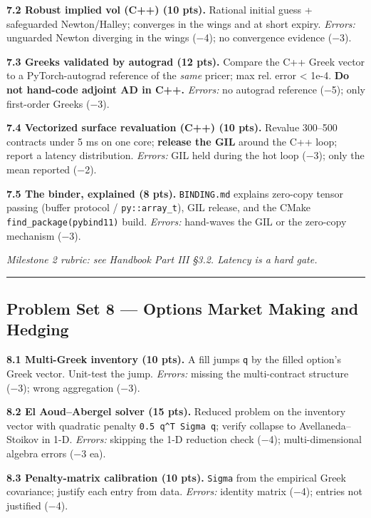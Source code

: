 \documentclass[
]{article}
\begin{document}
\textbf{7.2 Robust implied vol (C++) (10 pts).} Rational initial guess +
safeguarded Newton/Halley; converges in the wings and at short expiry.
\emph{Errors:} unguarded Newton diverging in the wings (−4); no
convergence evidence (−3).

\textbf{7.3 Greeks validated by autograd (12 pts).} Compare the C++
Greek vector to a PyTorch-autograd reference of the \emph{same} pricer;
max rel. error \textless{} 1e-4. \textbf{Do not hand-code adjoint AD in
C++.} \emph{Errors:} no autograd reference (−5); only first-order Greeks
(−3).

\textbf{7.4 Vectorized surface revaluation (C++) (10 pts).} Revalue
300--500 contracts under 5 ms on one core; \textbf{release the GIL}
around the C++ loop; report a latency distribution. \emph{Errors:} GIL
held during the hot loop (−3); only the mean reported (−2).

\textbf{7.5 The binder, explained (8 pts).} \texttt{BINDING.md} explains
zero-copy tensor passing (buffer protocol / \texttt{py::array\_t}), GIL
release, and the CMake \texttt{find\_package(pybind11)} build.
\emph{Errors:} hand-waves the GIL or the zero-copy mechanism (−3).

\emph{Milestone 2 rubric: see Handbook Part III §3.2. Latency is a hard
gate.}

\begin{center}\rule{0.5\linewidth}{0.5pt}\end{center}

\subsection{Problem Set 8 --- Options Market Making and
Hedging}\label{problem-set-8-options-market-making-and-hedging}

\textbf{8.1 Multi-Greek inventory (10 pts).} A fill jumps \texttt{q} by
the filled option's Greek vector. Unit-test the jump. \emph{Errors:}
missing the multi-contract structure (−3); wrong aggregation (−3).

\textbf{8.2 El Aoud--Abergel solver (15 pts).} Reduced problem on the
inventory vector with quadratic penalty \texttt{0.5\ q\^{}T\ Sigma\ q};
verify collapse to Avellaneda--Stoikov in 1-D. \emph{Errors:} skipping
the 1-D reduction check (−4); multi-dimensional algebra errors (−3 ea).

\textbf{8.3 Penalty-matrix calibration (10 pts).} \texttt{Sigma} from
the empirical Greek covariance; justify each entry from data.
\emph{Errors:} identity matrix (−4); entries not justified (−4).
\end{document}
